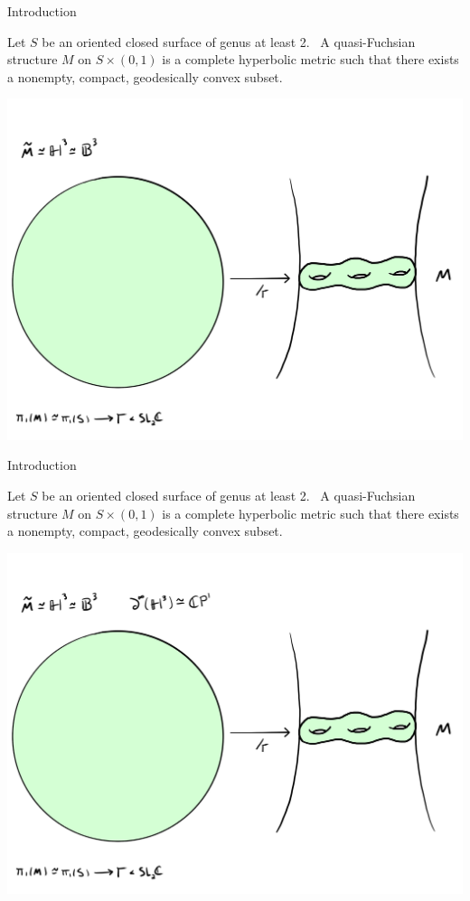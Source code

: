\documentclass[professionalfont]{beamer}
\begin{document}



\begin{frame}{Introduction}

Let $S$ be an oriented closed surface of genus at least 2.  \ A quasi-Fuchsian structure $M$ on $S \times (0,1)$ is a complete hyperbolic metric such that there exists a nonempty, compact, geodesically convex subset.


\centering\includegraphics[scale=0.09]{QF-3.jpg}
	


\end{frame}





\begin{frame}{Introduction}

Let $S$ be an oriented closed surface of genus at least 2.  \ A quasi-Fuchsian structure $M$ on $S \times (0,1)$ is a complete hyperbolic metric such that there exists a nonempty, compact, geodesically convex subset.


\centering\includegraphics[scale=0.09]{QF-4.jpg}
	


\end{frame}
\end{document}
